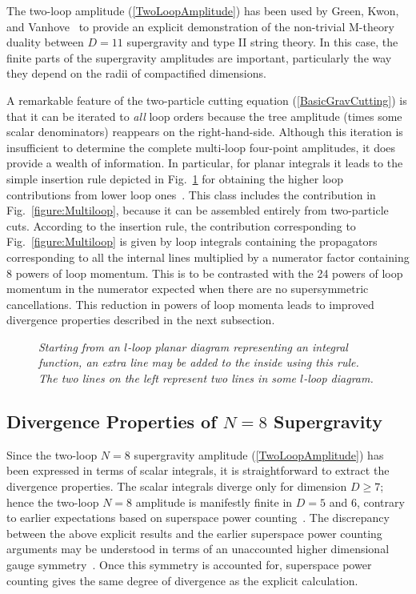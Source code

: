 \documentclass[12pt]{livrev}
\begin{document}
The two-loop amplitude (\ref{TwoLoopAmplitude}) has been used by
Green, Kwon, and Vanhove~\cite{GreenTwoLoop} to provide an explicit
demonstration of the non-trivial M-theory duality between $D=11$
supergravity and type II string theory.  In this case, the finite
parts of the supergravity amplitudes are important, particularly the
way they depend on the radii of compactified dimensions.

A remarkable feature of the two-particle cutting equation
(\ref{BasicGravCutting}) is that it can be iterated to {\it all} loop
orders because the tree amplitude (times some scalar denominators)
reappears on the right-hand-side. Although this iteration is
insufficient to determine the complete multi-loop four-point
amplitudes, it does provide a wealth of information.  In particular,
for planar integrals it leads to the simple insertion rule depicted in
Fig.~\ref{figure:InsertLine} for obtaining the higher loop
contributions from lower loop ones~\cite{BDDPR}.  This class includes
the contribution in Fig.~\ref{figure:Multiloop}, because it can be
assembled entirely from two-particle cuts.  According to the insertion
rule, the contribution corresponding to Fig.~\ref{figure:Multiloop} is
given by loop integrals containing the propagators corresponding to
all the internal lines multiplied by a numerator factor containing 8
powers of loop momentum.  This is to be contrasted with the 24 
powers of loop momentum in the numerator expected when there are no
supersymmetric cancellations.  This reduction in powers of loop
momenta leads to improved divergence properties
described in the next subsection.


\begin{figure}[h]
  \def\epsfsize#1#2{0.5#1} \centerline{}
  \caption{\it Starting from an $l$-loop planar diagram representing
  an integral function, an extra line may be added to the inside using
  this rule.  The two lines on the left represent two lines in
  some $l$-loop diagram.}  \label{figure:InsertLine}
\end{figure}


\subsection{Divergence Properties of $N=8$ Supergravity}
\label{subsection:divergences}

Since the two-loop $N=8$ supergravity amplitude
(\ref{TwoLoopAmplitude}) has been expressed in terms of scalar
integrals, it is straightforward to extract the divergence properties.
The scalar integrals diverge only for dimension $D\ge 7$; hence the
two-loop $N=8$ amplitude is manifestly finite in $D=5$ and $6$,
contrary to earlier expectations based on superspace
power counting~\cite{Howe89}.  The discrepancy between the above
explicit results and the earlier superspace power counting arguments
may be understood in terms of an unaccounted higher dimensional gauge
symmetry~\cite{Stelle}. Once this symmetry is accounted for,
superspace power counting gives the same degree of divergence as the
explicit calculation.
\end{document}
